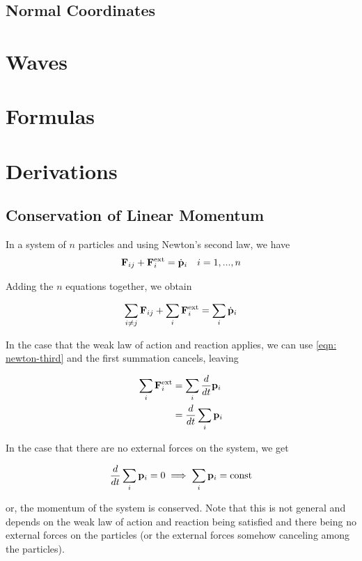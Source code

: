 \documentclass[main.tex]{subfiles}
\begin{document}
\section{Normal Coordinates}

\chapter{Waves}

\begin{appendices}
\chapter{Formulas}

\chapter{Derivations}

\section{Conservation of Linear Momentum}
In a system of $n$ particles and using Newton's second law, we have
\begin{align*}
\vec{F}_{ij} + \vec{F}_i^{\rm{ext}} = \dot{\vec{p}}_i && i = 1, ..., n
\end{align*}

Adding the $n$ equations together, we obtain

\begin{equation*}
\sum_{i \neq j} \vec{F}_{ij} + \sum_i \vec{F}_i^{\rm{ext}} = \sum_i \dot{\vec{p}}_i
\end{equation*}

In the case that the weak law of action and reaction applies, we can use
\cref{eqn: newton-third} and the first summation cancels, leaving

\begin{align*}
\sum_i \vec{F}^{\rm{ext}}_i &= \sum_i \frac{d}{dt} \vec{p}_i \\
&= \frac{d}{dt} \sum_i \vec{p}_i
\end{align*}

In the case that there are no external forces on the system, we get

$$
\frac{d}{dt} \sum_i \vec{p}_i = 0 \implies \sum_i \vec{p}_i = \rm{const}
$$

or, the momentum of the system is conserved. Note that this is not general and depends
on the weak law of action and reaction being satisfied and there being no external forces
on the particles (or the external forces somehow canceling among the particles).


\end{appendices}
\end{document}
